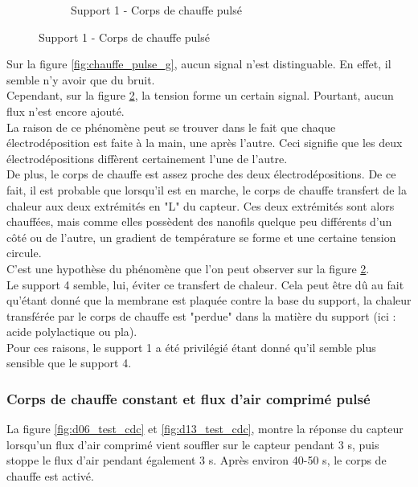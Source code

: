 \begin{figure}[H]
\begin{subfigure}[b]{0.45\textwidth}
        \caption{Support 1 - Corps de chauffe pulsé}
        \label{fig:chauffe_pulse_b}
    \end{subfigure}
\end{figure}

Sur la figure \ref{fig:chauffe_pulse_g}, aucun signal n'est distinguable. En effet, il semble n'y avoir que du bruit. \\

Cependant, sur la figure \ref{fig:chauffe_pulse_b}, la tension forme un certain signal. Pourtant, aucun flux n'est encore ajouté. \\
La raison de ce phénomène peut se trouver dans le fait que chaque électrodéposition est faite à la main, une après l'autre. Ceci signifie que
les deux électrodépositions diffèrent certainement l'une de l'autre. \\
De plus, le corps de chauffe est assez proche des deux électrodépositions. De ce fait, il est probable que lorsqu'il est en marche, le corps de
chauffe transfert de la chaleur aux deux extrémités en "L" du capteur. Ces deux extrémités sont alors chauffées, mais comme elles possèdent des nanofils
quelque peu différents d'un côté ou de l'autre, un gradient de température se forme et une certaine tension circule. \\
C'est une hypothèse du phénomène que l'on peut observer sur la figure \ref{fig:chauffe_pulse_b}.\\

Le support 4 semble, lui, éviter ce transfert de chaleur. Cela peut être dû au fait qu'étant donné que la membrane est plaquée contre
la base du support, la chaleur transférée par le corps de chauffe est "perdue" dans la matière du support (ici : acide polylactique ou \gls{pla}).\\

Pour ces raisons, le support 1 a été privilégié étant donné qu'il semble plus sensible que le support 4.\\

\subsubsection{Corps de chauffe constant et flux d'air comprimé pulsé}
La figure \ref{fig:d06_test_cdc} et \ref{fig:d13_test_cdc}, montre la réponse du capteur lorsqu'un flux d'air comprimé vient souffler sur le capteur pendant 3 s, puis 
stoppe le flux d'air pendant également 3 s. Après environ 40-50 s, le corps de chauffe est activé. 

